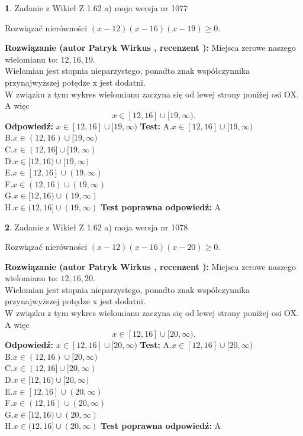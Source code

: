 \documentclass[12pt, a4paper]{article}
\theoremstyle{definition} %
\newtheorem{zad}{}
\newcommand{\zadStart}[1]{\begin{zad}#1\newline}
\newcommand{\zadStop}{\end{zad}}
\newcommand{\rozwStart}[2]{\noindent \textbf{Rozwiązanie (autor #1 , recenzent #2): }\newline}
\newcommand{\rozwStop}{\newline}
\newcommand{\odpStart}{\noindent \textbf{Odpowiedź:}\newline}
\newcommand{\odpStop}{\newline}
\newcommand{\testStart}{\noindent \textbf{Test:}\newline}
\newcommand{\testStop}{\newline}
\newcommand{\kluczStart}{\noindent \textbf{Test poprawna odpowiedź:}\newline}
\newcommand{\kluczStop}{\newline}
\begin{document}
\zadStart{Zadanie z Wikieł Z 1.62 a) moja wersja nr 1077}

Rozwiązać nierówności $(x-12)(x-16)(x-19)\ge0$.
\zadStop
\rozwStart{Patryk Wirkus}{}
Miejsca zerowe naszego wielomianu to: $12, 16, 19$.\\
Wielomian jest stopnia nieparzystego, ponadto znak współczynnika przy\linebreak najwyższej potędze x jest dodatni.\\ W związku z tym wykres wielomianu zaczyna się od lewej strony poniżej osi OX. A więc $$x \in [12,16] \cup [19,\infty).$$
\rozwStop
\odpStart
$x \in [12,16] \cup [19,\infty)$
\odpStop
\testStart
A.$x \in [12,16] \cup [19,\infty)$\\
B.$x \in (12,16) \cup [19,\infty)$\\
C.$x \in (12,16] \cup [19,\infty)$\\
D.$x \in [12,16) \cup [19,\infty)$\\
E.$x \in [12,16] \cup (19,\infty)$\\
F.$x \in (12,16) \cup (19,\infty)$\\
G.$x \in [12,16) \cup (19,\infty)$\\
H.$x \in (12,16] \cup (19,\infty)$
\testStop
\kluczStart
A
\kluczStop



\zadStart{Zadanie z Wikieł Z 1.62 a) moja wersja nr 1078}

Rozwiązać nierówności $(x-12)(x-16)(x-20)\ge0$.
\zadStop
\rozwStart{Patryk Wirkus}{}
Miejsca zerowe naszego wielomianu to: $12, 16, 20$.\\
Wielomian jest stopnia nieparzystego, ponadto znak współczynnika przy\linebreak najwyższej potędze x jest dodatni.\\ W związku z tym wykres wielomianu zaczyna się od lewej strony poniżej osi OX. A więc $$x \in [12,16] \cup [20,\infty).$$
\rozwStop
\odpStart
$x \in [12,16] \cup [20,\infty)$
\odpStop
\testStart
A.$x \in [12,16] \cup [20,\infty)$\\
B.$x \in (12,16) \cup [20,\infty)$\\
C.$x \in (12,16] \cup [20,\infty)$\\
D.$x \in [12,16) \cup [20,\infty)$\\
E.$x \in [12,16] \cup (20,\infty)$\\
F.$x \in (12,16) \cup (20,\infty)$\\
G.$x \in [12,16) \cup (20,\infty)$\\
H.$x \in (12,16] \cup (20,\infty)$
\testStop
\kluczStart
A
\kluczStop
\end{document}
